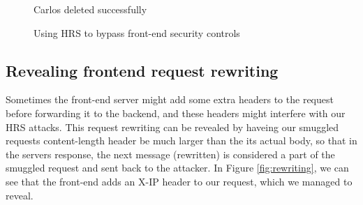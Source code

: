 \documentclass[conference]{IEEEtran}
\begin{document}
\begin{figure}[htbp]
\begin{minipage}[t]{0.45\linewidth}
	  \captionsetup{justification=centering}
	  \caption*{Carlos deleted successfully}
	  \label{fig:bypass_req2}
	\end{minipage}
  
	\caption{Using HRS to bypass front-end security controls}
	\label{fig:bypass}
\end{figure}

\subsection*{Revealing frontend request rewriting}
Sometimes the front-end server might add some extra headers to the request before forwarding it to the backend, and these headers might interfere with our HRS attacks. This request rewriting can be revealed by haveing our smuggled requests content-length header be much larger than the its actual body, so that in the servers response, the next message (rewritten) is considered a part of the smuggled request and sent back to the attacker. In Figure \ref*{fig:rewriting}, we can see that the front-end adds an X-IP header to our request, which we managed to reveal.
\end{document}
